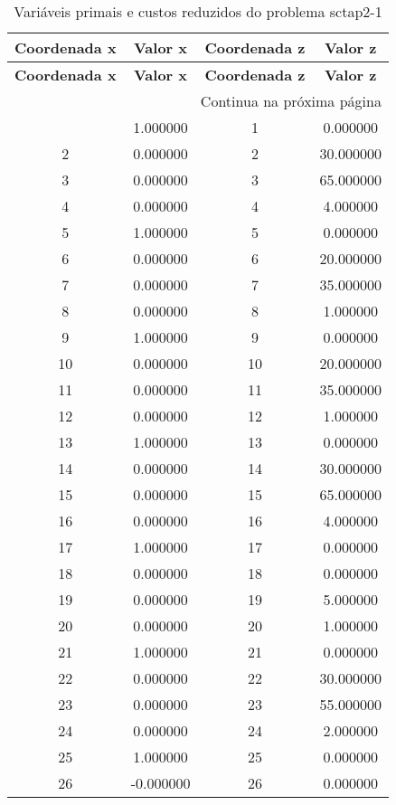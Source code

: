 \documentclass[12pt]{article}
\begin{document}
\begin{longtable}{@{}cccc@{}}
\caption{Variáveis primais e custos reduzidos do problema sctap2-1} \\
\toprule
\textbf{Coordenada x} & \textbf{Valor x} & \textbf{Coordenada z} & \textbf{Valor z} \\
\midrule
\endfirsthead

\toprule
\textbf{Coordenada x} & \textbf{Valor x} & \textbf{Coordenada z} & \textbf{Valor z} \\
\midrule
\endhead

\midrule \multicolumn{4}{r}{{Continua na próxima página}} \\ \midrule
\endfoot

\bottomrule
\endlastfoot
1 & 1.000000 & 1 & 0.000000 \\
2 & 0.000000 & 2 & 30.000000 \\
3 & 0.000000 & 3 & 65.000000 \\
4 & 0.000000 & 4 & 4.000000 \\
5 & 1.000000 & 5 & 0.000000 \\
6 & 0.000000 & 6 & 20.000000 \\
7 & 0.000000 & 7 & 35.000000 \\
8 & 0.000000 & 8 & 1.000000 \\
9 & 1.000000 & 9 & 0.000000 \\
10 & 0.000000 & 10 & 20.000000 \\
11 & 0.000000 & 11 & 35.000000 \\
12 & 0.000000 & 12 & 1.000000 \\
13 & 1.000000 & 13 & 0.000000 \\
14 & 0.000000 & 14 & 30.000000 \\
15 & 0.000000 & 15 & 65.000000 \\
16 & 0.000000 & 16 & 4.000000 \\
17 & 1.000000 & 17 & 0.000000 \\
18 & 0.000000 & 18 & 0.000000 \\
19 & 0.000000 & 19 & 5.000000 \\
20 & 0.000000 & 20 & 1.000000 \\
21 & 1.000000 & 21 & 0.000000 \\
22 & 0.000000 & 22 & 30.000000 \\
23 & 0.000000 & 23 & 55.000000 \\
24 & 0.000000 & 24 & 2.000000 \\
25 & 1.000000 & 25 & 0.000000 \\
26 & -0.000000 & 26 & 0.000000 \\

\end{longtable}
\end{document}
